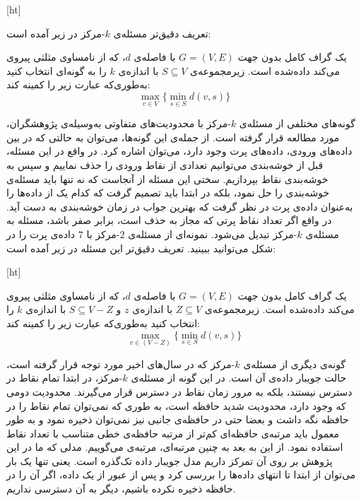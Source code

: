 [ht]


تعریف دقیق‌تر مسئله‌ی $k$-مرکز در زیر آمده است:

یک گراف کامل بدون جهت $G = (V, E)$ با فاصله‌ی $d$، که از نامساوی مثلثی پیروی می‌کند داده‌شده است. زیرمجموعه‌ی $S \subseteq V$ با اندازه‌ی $k$ را به گونه‌ای انتخاب کنید به‌طوری‌که عبارت زیر را کمینه کند:
$$\max_{v \in V} \{ \min_{s \in S} d(v, s) \}$$

گونه‌های مختلفی از مسئله‌ی $k$-مرکز با محدودیت‌های متفاوتی به‌وسیله‌ی پژوهشگران، مورد مطالعه قرار گرفته است. از جمله‌ی این گونه‌ها، می‌توان به حالتی که در بین داده‌های ورودی، داده‌های پرت وجود دارد، می‌توان اشاره کرد. در واقع در این مسئله، قبل از خوشه‌بندی می‌توانیم تعدادی از نقاط ورودی را حذف نماییم و سپس به خوشه‌بندی نقاط بپردازیم. سختی این مسئله از آنجاست که نه تنها باید مسئله‌ی خوشه‌بندی را حل نمود، بلکه در ابتدا باید تصمیم گرفت که کدام یک از داده‌ها را به‌عنوان داده‌ی پرت در نظر گرفت که بهترین جواب در زمان خوشه‌بندی به دست آید. در واقع اگر تعداد نقاط پرتی که مجاز‌ به حذف است، برابر صفر باشد، مسئله به مسئله‌ی $k$-مرکز تبدیل می‌شود. نمونه‌ای از مسئله‌ی $2$-مرکز با $7$ داده‌ی پرت را در شکل  می‌توانید ببینید. تعریف دقیق‌تر این مسئله در زیر آمده است:

[ht]


یک گراف کامل بدون جهت $G = (V, E)$ با فاصله‌ی $d$، که از نامساوی مثلثی پیروی می‌کند داده‌شده است. زیرمجموعه‌ی $Z \subseteq V$ با اندازه‌ی $z$ و $S \subseteq V - Z$ با اندازه‌ی $k$ را انتخاب کنید به‌طوری‌که عبارت زیر را کمینه کند:
$$\max_{v \in (V - Z)} \{ \min_{s \in S} d(v, s) \}$$

گونه‌ی دیگری از‌ مسئله‌ی $k$-مرکز که در سال‌های اخیر مورد توجه قرار گرفته است، حالت جویبار داده‌ی آن است. در این گونه از مسئله‌ی $k$-مرکز، در ابتدا تمام نقاط در دسترس نیستند، بلکه به مرور زمان نقاط در دسترس قرار می‌گیرند. محدودیت دومی که وجود دارد، محدودیت شدید حافظه است، به طوری که نمی‌توان تمام نقاط را در حافظه نگه داشت و بعضا حتی در حافظه‌ی جانبی نیز نمی‌توان ذخیره نمود و به طور معمول باید مرتبه‌ی حافظه‌ای کم‌تر از مرتبه حافظه‌ی خطی متناسب با تعداد نقاط استفاده نمود. از این به بعد به چنین مرتبه‌ای، مرتبه‌ی  می‌گوییم. مدلی که ما در این پژوهش بر روی آن تمرکز داریم مدل جویبار داده تک‌گذره  است. یعنی تنها یک بار می‌توان از ابتدا تا انتهای داده‌ها را بررسی کرد و پس از عبور از‌ یک داده، اگر آن‌ را در حافظه ذخیره نکرده باشیم، دیگر به آن دسترسی نداریم.

